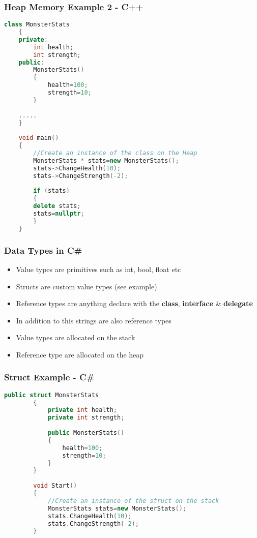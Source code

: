 \begin{frame}[fragile]
\frametitle{Heap Memory Example 2 - C++}
\begin{lstlisting}[language=C++,basicstyle=\tiny,]
	class MonsterStats
	{
	private:
		int health;
		int strength;
	public:
		MonsterStats()
		{
			health=100;
			strength=10;
		}
		
	.....
	}
	
	void main()
	{		
		//Create an instance of the class on the Heap
		MonsterStats * stats=new MonsterStats();
		stats->ChangeHealth(10);
		stats->ChangeStrength(-2);
	
		if (stats)
		{
		delete stats;
		stats=nullptr;
		}
	}
\end{lstlisting}
\end{frame}

\begin{frame}
\frametitle{Data Types in C\#}
\begin{itemize}
	\item Value types are primitives such as int, bool, float etc
	\item Structs are custom value types (see example)
	\item Reference types are anything declare with the \textbf{class}, \textbf{interface} \& \textbf{delegate}
	\item In addition to this strings are also reference types
	\item Value types are allocated on the stack
	\item Reference type are allocated on the heap
\end{itemize}
\end{frame}

\begin{frame}[fragile]
\frametitle{Struct Example - C\#}
	\begin{lstlisting}[language=C++,basicstyle=\tiny,]
		public struct MonsterStats
		{
			private int health;
			private int strength;
			
			public MonsterStats()
			{
				health=100;
				strength=10;
			}
		}
	
		void Start()
		{		
			//Create an instance of the struct on the stack
			MonsterStats stats=new MonsterStats();
			stats.ChangeHealth(10);
			stats.ChangeStrength(-2);
		}	
	\end{lstlisting}
\end{frame}

